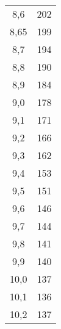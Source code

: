 \begin{longtable}{cc}
8,6  &202\\
8,65 &199\\
8,7  &194\\
8,8  &190\\
8,9  &184\\
9,0  &178\\
9,1  &171\\
9,2  &166\\
9,3  &162\\
9,4  &153\\
9,5  &151\\
9,6  &146\\
9,7  &144\\
9,8  &141\\
9,9  &140\\
10,0 &137\\
10,1 &136\\
10,2 &137\\
\end{longtable}
